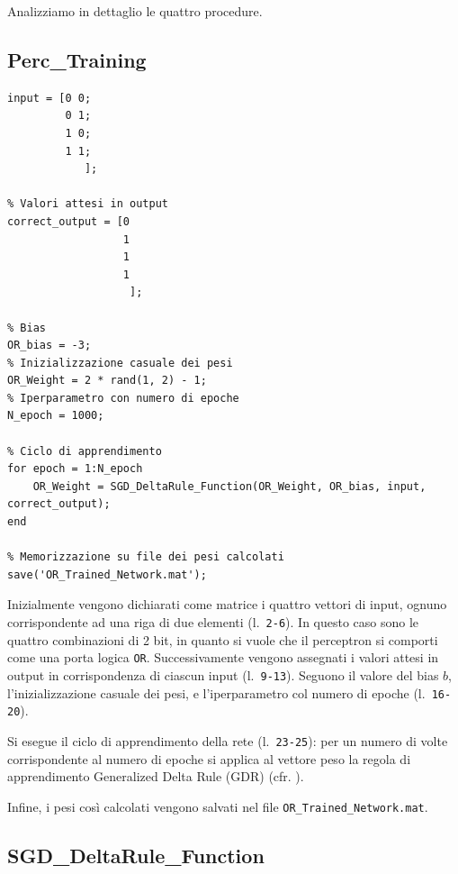 \documentclass[a4paper,11pt]{article}
\begin{document}
\noindent Analizziamo in dettaglio le quattro procedure.


\subsection{Perc\_Training}

\begin{lstlisting}[style=Matlab-editor,title=\texttt{Perc\_Training.mat}]
% Vettori di input (training set)
input = [0 0;
         0 1;
         1 0;
         1 1;
            ];

% Valori attesi in output
correct_output = [0
                  1
                  1
                  1
                   ];

% Bias
OR_bias = -3;
% Inizializzazione casuale dei pesi
OR_Weight = 2 * rand(1, 2) - 1;
% Iperparametro con numero di epoche
N_epoch = 1000;

% Ciclo di apprendimento
for epoch = 1:N_epoch
    OR_Weight = SGD_DeltaRule_Function(OR_Weight, OR_bias, input, correct_output);
end

% Memorizzazione su file dei pesi calcolati
save('OR_Trained_Network.mat');
\end{lstlisting}

Inizialmente vengono dichiarati come matrice i quattro vettori di input, ognuno corrispondente ad una riga di due elementi (l.~\texttt{2-6}). In questo caso sono le quattro combinazioni di 2 bit, in quanto si vuole che il perceptron si comporti come una porta logica \texttt{OR}. Successivamente vengono assegnati i valori attesi in output in corrispondenza di ciascun input (l.~\texttt{9-13}). Seguono il valore del bias $b$, l'inizializzazione casuale dei pesi, e l'iperparametro col numero di epoche (l.~\texttt{16-20}).

Si esegue il ciclo di apprendimento della rete (l.~\texttt{23-25}): per un numero di volte corrispondente al numero di epoche si applica al vettore peso la regola di apprendimento Generalized Delta Rule (GDR) (cfr. ).

Infine, i pesi così calcolati vengono salvati nel file \texttt{OR\_Trained\_Network.mat}.


\subsection{SGD\_DeltaRule\_Function}\label{sgd-drf}
\end{document}
